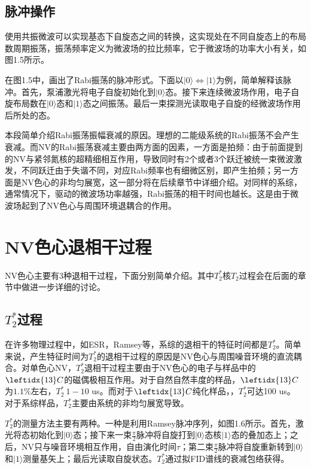\subsection{脉冲操作}

使用共振微波可以实现基态下自旋态之间的转换，这实现处在不同自旋态上的布局数周期振荡，振荡频率定义为微波场的拉比频率，它于微波场的功率大小有关，如图1.5所示。

在图1.5中，画出了Rabi振荡的脉冲形式。下面以$|0\rangle \Longleftrightarrow |1\rangle$为例，简单解释该脉冲。首先，泵浦激光将电子自旋初始化到$|0\rangle$态。接下来连续微波场作用，电子自旋布局数在$|0\rangle$态和$|1\rangle$态之间振荡。最后一束探测光读取电子自旋的经微波场作用后所处的态。

本段简单介绍Rabi振荡振幅衰减的原因。理想的二能级系统的Rabi振荡不会产生衰减。而NV的Rabi振荡衰减主要由两方面的因素，一方面是拍频：由于前面提到的NV与紧邻氮核的超精细相互作用，导致同时有2个或者3个跃迁被统一束微波激发，不同跃迁由于失谐不同，对应Rabi频率也有细微区别，即产生拍频；另一方面是NV色心的非均匀展宽，这一部分将在后续章节中详细介绍。对同样的系综，通常情况下，驱动的微波场功率越强，Rabi振荡的相干时间也越长。这是由于微波场起到了NV色心与周围环境退耦合的作用。

\section{NV色心退相干过程}

NV色心主要有3种退相干过程，下面分别简单介绍。其中$T_2^*$核$T_2$过程会在后面的章节中做进一步详细的讨论。
\subsection{$T_2^*$过程}
在许多物理过程中，如ESR，Ramsey等，系综的退相干的特征时间都是$T_2^*$。简单来说，产生特征时间为$T_2^*$的退相干过程的原因是NV色心与周围噪音环境的直流耦合。对单色心NV，$T_2^*$退相干过程主要由于NV色心的电子与样品中的$\leftidx{13}C$的磁偶极相互作用。对于自然自然丰度的样品，$\leftidx{13}C$为$1.1\%$左右，$T_2^*~1-10$ us。而对于$\leftidx{13}C$纯化样品，，$T_2^*$可达100 us。
对于系综样品，$T_2^*$主要由系统的非均匀展宽导致。

$T_2^*$的测量方法主要有两种。一种是利用Ramsey脉冲序列，如图1.6所示。首先，激光将态初始化到$|0\rangle$态；接下来一束$\frac{\pi}{2}$脉冲将自旋打到$|0\rangle$态核$|1\rangle$态的叠加态上；之后，NV只与噪音环境相互作用，自由演化时间$\tau$；第二束$\frac{\pi}{2}$脉冲将自旋重新转到$|0\rangle$和$|1\rangle$测量基矢上；最后光读取自旋状态。$T_2^*$通过拟FID谱线的衰减包络获得。

